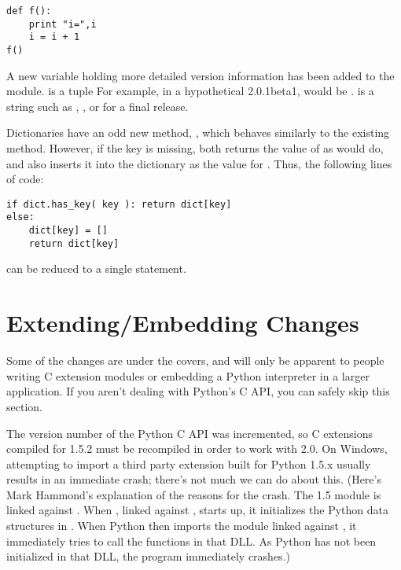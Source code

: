 \documentclass{howto}
\begin{document}
\begin{verbatim}
def f():
    print "i=",i
    i = i + 1 
f()
\end{verbatim}

A new variable holding more detailed version information has been
added to the  module.   is a tuple
 For example, in a hypothetical 2.0.1beta1,
 would be .
 is a string such as , , or
 for a final release.

Dictionaries have an odd new method, , which behaves similarly to the existing
 method.  However, if the key is missing,
 both returns the value of  as
 would do, and also inserts it into the dictionary as
the value for .  Thus, the following lines of code:

\begin{verbatim}
if dict.has_key( key ): return dict[key]
else: 
    dict[key] = []
    return dict[key]
\end{verbatim}

can be reduced to a single  statement.

\section{Extending/Embedding Changes}

Some of the changes are under the covers, and will only be apparent to
people writing C extension modules or embedding a Python interpreter
in a larger application.  If you aren't dealing with Python's C API,
you can safely skip this section.

The version number of the Python C API was incremented, so C
extensions compiled for 1.5.2 must be recompiled in order to work with
2.0.  On Windows, attempting to import a third party extension built
for Python 1.5.x usually results in an immediate crash; there's not
much we can do about this.  (Here's Mark Hammond's explanation of the
reasons for the crash.  The 1.5 module is linked against
.  When  , linked against
, starts up, it initializes the Python data
structures in .  When Python then imports the
module  linked against , it
immediately tries to call the functions in that DLL.  As Python has
not been initialized in that DLL, the program immediately crashes.)
\end{document}
